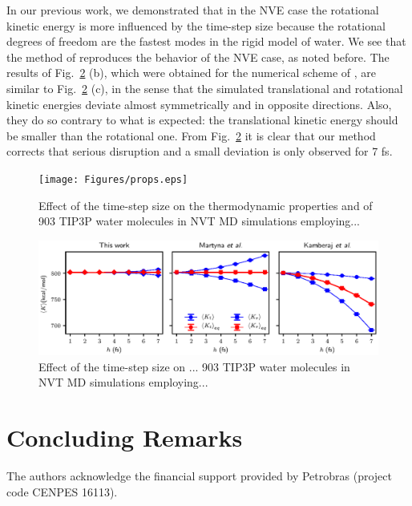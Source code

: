 \documentclass[
journal=jctcce,
layout=twocolumn
]{achemso}
\begin{document}
In our previous work\cite{Silveira_2017}, we demonstrated that in the NVE case the rotational kinetic energy is more influenced by the time-step size because the rotational degrees of freedom are the fastest modes in the rigid model of water. 
We see that the method of \citeauthor{Kamberaj_2005} \cite{Kamberaj_2005} reproduces the behavior of the NVE case, as noted before.
The results of Fig.~\ref{fig:energy_partition} (b), which were obtained for the numerical scheme of \citeauthor{Martyna_1996} \cite{Martyna_1996}, are similar to Fig.~\ref{fig:energy_partition} (c), in the sense that the simulated translational and rotational kinetic energies deviate almost symmetrically and in opposite directions. Also, they do so contrary to what is expected: the translational kinetic energy should be smaller than the rotational one.
From Fig.~\ref{fig:energy_partition} it is clear that our method corrects that serious disruption and a small deviation is only observed for 7 fs.


\begin{figure}
	\texttt{[image: Figures/props.eps]}
	\caption{Effect of the time-step size on the thermodynamic properties and of 903 TIP3P\cite{Jorgensen_1983} water molecules in NVT MD simulations employing...}
	\label{fig:properties}
\end{figure}

\begin{figure}
	\includegraphics{Figures/energy_partition.eps}
		\caption{Effect of the time-step size on ... 903 TIP3P\cite{Jorgensen_1983} water molecules in NVT MD simulations employing...}
	\label{fig:energy_partition}
\end{figure}


\section{Concluding Remarks}
\label{sec:conclusion}

\begin{acknowledgement}
	The authors acknowledge the financial support provided by Petrobras (project code CENPES 16113).
\end{acknowledgement}
\end{document}
